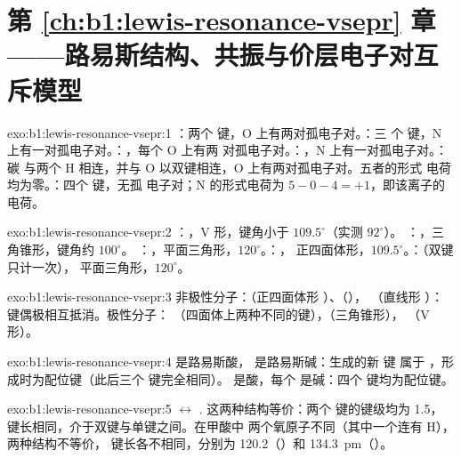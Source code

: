 \section*{第 \ref{ch:b1:lewis-resonance-vsepr} 章——路易斯结构、共振与价层电子对互斥模型}

\begin{solution}{exo:b1:lewis-resonance-vsepr:1}
：两个  键，O 上有两对孤电子对。：三
个  键，N 上有一对孤电子对。：，每个 O 上有两
对孤电子对。：，N 上有一对孤电子对。：碳
与两个 H 相连，并与 O 以双键相连，O 上有两对孤电子对。五者的形式
电荷均为零。：四个  键，无孤
电子对；N 的形式电荷为 $5 - 0 - 4 = +1$，即该离子的电荷。
\end{solution}

\begin{solution}{exo:b1:lewis-resonance-vsepr:2}
：，V 形，键角小于 $109.5^\circ$（实测 $92^\circ$）。
：，三角锥形，键角约 $100^\circ$。
：，平面三角形，$120^\circ$。：，
正四面体形，$109.5^\circ$。：（双键只计一次），
平面三角形，$120^\circ$。
\end{solution}

\begin{solution}{exo:b1:lewis-resonance-vsepr:3}
非极性分子：（正四面体形 ）、（），
（直线形 ）：键偶极相互抵消。极性分子：
（四面体上两种不同的键），（三角锥形），
（V 形）。
\end{solution}

\begin{solution}{exo:b1:lewis-resonance-vsepr:4}
 是路易斯酸， 是路易斯碱：生成的新  键
属于 ，形成时为配位键（此后三个  键完全相同）。
 是酸，每个  是碱：四个
 键均为配位键。
\end{solution}

\begin{solution}{exo:b1:lewis-resonance-vsepr:5}
$\leftrightarrow$
.
这两种结构等价：两个  键的键级均为 1.5，
键长相同，介于双键与单键之间。在甲酸中
两个氧原子不同（其中一个连有 H），两种结构不等价，
键长各不相同，分别为 120.2（）和
\qty{134.3}{pm}（）。
\end{solution}

